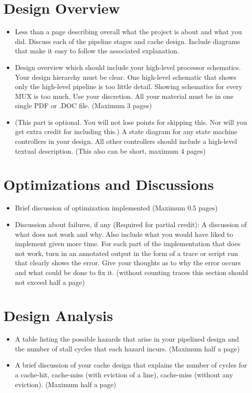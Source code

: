 \documentclass[11pt]{article}
\begin{document}
\section{Design Overview}
\begin{itemize}
\item[---] Less than a page describing overall what the project is about and what you did. Discuss each of the pipeline stages
and cache design.  Include diagrams that make it easy to follow the associated explanation.

\item[---] 
Design overview which should include your high-level processor schematics. Your design hierarchy must be clear.
One high-level schematic that shows only the high-level pipeline is too little detail. Showing schematics for every
MUX is too much. Use your discretion. All your material must be in one single PDF
or .DOC file. (Maximum 3 pages)

\item[---] (This part is optional. You will not lose points for skipping this. Nor will you get extra credit for including this.) A
state diagram for any state machine controllers in your design. All other controllers should include a high-level
textual description. (This also can be short, maximum 4 pages)
\end{itemize}

\section{Optimizations and Discussions}
\begin{itemize}
\item[---] Brief discussion of optimization implemented (Maximum 0.5 pages)
\item[---] Discussion about failures, if any (Required for partial credit): A discussion of what does not work and why. Also
include what you would have liked to implement given more time. For each part of the implementation that does not
work, turn in an annotated output in the form of a trace or script run that clearly shows the error. Give your thoughts
as to why the error occurs and what could be done to fix it. (without counting traces this section should not exceed
half a page)
\end{itemize}

\section{Design Analysis}
\begin{itemize}
\item[---] A table listing the possible hazards that arise in your pipelined design and the number of stall cycles that each hazard
incurs. (Maximum half a page)
\item[---] A brief discussion of your cache design that explains the number of cycles for a cache-hit, cache-miss (with eviction
of a line), cache-miss (without any eviction). (Maximum half a page)
\end{itemize}
\end{document}
